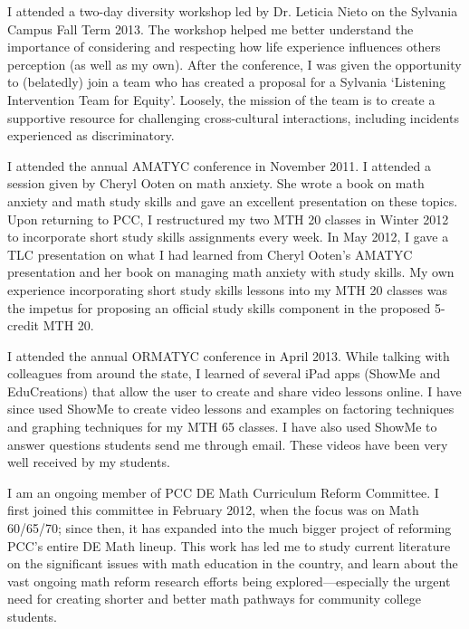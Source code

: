 \begin{description}[style=nextline]
	I attended a two-day diversity workshop led by Dr. Leticia Nieto on the
	Sylvania Campus Fall Term 2013.  The workshop helped me better understand the
	importance of considering and respecting how life experience influences others
	perception (as well as my own). After the conference, I was given the
	opportunity to (belatedly) join a team who has created a proposal for a
	Sylvania `Listening Intervention Team for Equity'. Loosely, the mission
	of the team is to create a supportive resource for challenging cross-cultural
	interactions, including incidents experienced as discriminatory.

	\item[Virginia Somes (Full-time Instructor, Cascade Campus)]
	I attended the annual AMATYC conference in November 2011.  I attended a session
	given by Cheryl Ooten on math anxiety.  She wrote a book on math anxiety and
	math study skills and gave an excellent presentation on these topics.  Upon
	returning to PCC, I restructured my two MTH 20 classes in Winter 2012 to
	incorporate short study skills assignments every week.  In May 2012, I gave a
	TLC presentation on what I had learned from Cheryl Ooten's AMATYC
	presentation and her book on managing math anxiety with study skills.  My own
	experience incorporating short study skills lessons into my MTH 20 classes was
	the impetus for proposing an official study skills component in the proposed
	5-credit MTH 20.

	I attended the annual ORMATYC conference in April 2013.  While talking with
	colleagues from around the state, I learned of several iPad apps (ShowMe and
	EduCreations) that allow the user to create and share video lessons online.  I
	have since used ShowMe to create video lessons and examples on factoring
	techniques and graphing techniques for my MTH 65 classes.  I have also used
	ShowMe to answer questions students send me through email.  These videos have
	been very well received by my students.

	\item[Thomas Songer (Full-time Instructor, Sylvania Campus)]
	I am an ongoing member of PCC DE Math Curriculum Reform Committee.  I first
	joined this committee in February 2012, when the focus was on Math 60/65/70;
	since then, it has expanded into the much bigger project of reforming PCC's
	entire DE Math lineup.  This work has led me to study current literature on the
	significant issues with math education in the country, and learn about the vast
	ongoing math reform research efforts being explored---especially the urgent
	need for creating shorter and better math pathways for community college
	students.


\end{description}
